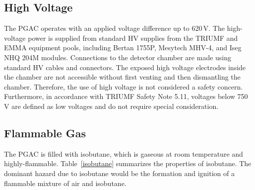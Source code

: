 \subsection{High Voltage}
The PGAC operates with an applied voltage difference up to 620\,V. The high-voltage power is supplied from standard HV supplies from the TRIUMF and EMMA equipment pools, including Bertan 1755P, Mesytech MHV-4, and Iseg NHQ 204M modules.  Connections to the detector chamber are made using standard HV cables and connectors. The exposed high voltage electrodes inside the chamber are not accessible without first venting and then dismantling the chamber.  Therefore, the use of high voltage is not considered a safety concern.  Furthermore, in accordance with TRIUMF Safety Note 5.11, voltages below 750\,V are defined as low voltages and do not require special consideration.
\subsection{Flammable Gas}
\label{flame}
The PGAC is filled with %
isobutane, which is gaseous at room temperature and highly-flammable.
Table~\ref{isobutane} summarizes the properties of isobutane.
The dominant hazard due to isobutane would be the formation and ignition of a flammable mixture of air and isobutane.
